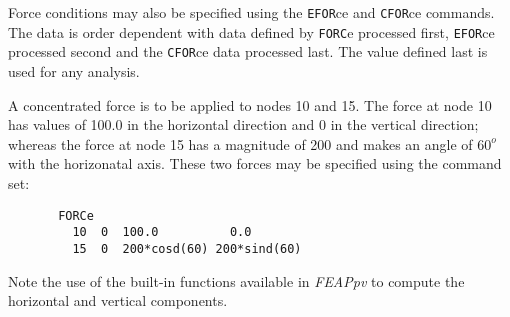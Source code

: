 Force conditions may also be specified using the {\tt EFOR}ce and {\tt CFOR}ce
commands.  The data is order dependent with data
defined by {\tt FORC}e processed first, {\tt EFOR}ce processed second and
the {\tt CFOR}ce data processed last.  The value defined last is used for
any analysis.


A concentrated force is to be applied to nodes 10 and 15.  The force at node
10 has values of 100.0 in the horizontal direction and 0 in the vertical
direction; whereas the force at node 15 has a magnitude of 200 and makes an
angle of $60^o$ with the horizonatal axis.  These two forces may be specified
using the command set:
\begin{verbatim}
       FORCe
         10  0  100.0          0.0
         15  0  200*cosd(60) 200*sind(60)
\end{verbatim}
Note the use of the built-in functions available in \textsl{FEAPpv} to compute
the horizontal and vertical components.

\vfil\eject
